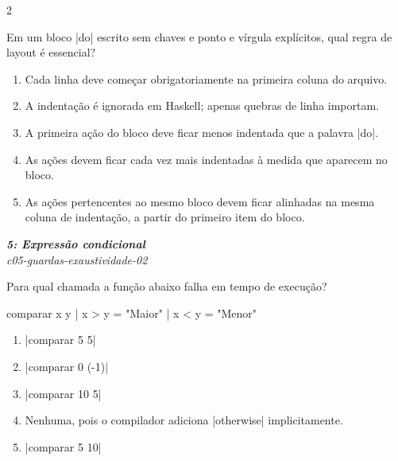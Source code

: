 \documentclass[a4paper,10pt,brazil]{article}
\begin{document}
\begin{multicols}{2}
\begin{flushright}
\end{flushright}
Em um bloco \haskellinline|do| escrito sem chaves e ponto e vírgula explícitos, qual regra de layout é essencial?

\begin{enumerate}
  \item Cada linha deve começar obrigatoriamente na primeira coluna do arquivo.

  \item A indentação é ignorada em Haskell; apenas quebras de linha importam.

  \item A primeira ação do bloco deve ficar menos indentada que a palavra \haskellinline|do|.

  \item As ações devem ficar cada vez mais indentadas à medida que aparecem no bloco.

  \item As ações pertencentes ao mesmo bloco devem ficar alinhadas na mesma coluna de indentação, a partir do primeiro item do bloco.


\end{enumerate}

\begin{flushright}
  \footnotesize
  \textit{\textbf{5: Expressão condicional}}\\
  \textit{c05-guardas-exaustividade-02}\\

\end{flushright}
Para qual chamada a função abaixo falha em tempo de execução?
\begin{haskellcode}
comparar x y
  | x > y = "Maior"
  | x < y = "Menor"
\end{haskellcode}

\begin{enumerate}
  \item \haskellinline|comparar 5 5|

  \item \haskellinline|comparar 0 (-1)|

  \item \haskellinline|comparar 10 5|

  \item Nenhuma, pois o compilador adiciona \haskellinline|otherwise| implicitamente.

  \item \haskellinline|comparar 5 10|



\end{enumerate}
\end{multicols}
\end{document}
